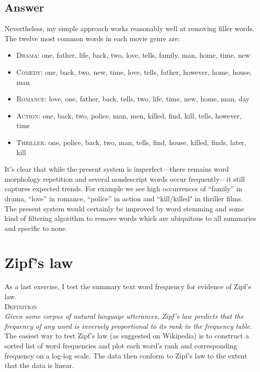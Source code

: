 \documentclass[aps,prc,reprint,amsmath]{revtex4-1}
\begin{document}
\subsection*{Answer}
Nevertheless, my simple approach works reasonably well at removing filler words. The twelve most common words in each movie genre are: 
\begin{itemize}
  \item \textsc{Drama}: one, father, life, back, two, love, tells, family, man, home, time, new 
  \item \textsc{Comedy}: one, back, two, new, time, love, tells, father, however, home, house, man
  \item \textsc{Romance}: love, one, father, back, tells, two, life, time, new, home, man, day
  \item \textsc{Action}: one, back, two, police, man, men, killed, find, kill, tells, however, time 
  \item \textsc{Thriller}: one, police, back, two, man, tells, find, house, killed, finds, later, kill 
\end{itemize}

It's clear that while the present system is imperfect---there remains word morphology repetition and several nondescript words occur frequently---it still captures expected trends. For example we see high occurrences of ``family'' in drama, ``love'' in romance, ``police'' in action and ``kill/killed" in thriller films. The present system would certainly be improved by word stemming and some kind of filtering algorithm to remove words which are ubiquitous to all summaries and specific to none. 

\section{Zipf's law}

As a last exercise, I test the summary text word frequency for evidence of Zipf's law.\\[2ex]
{\noindent \textsc{Definition}\\ 
\emph{Given some corpus of natural language utterances, Zipf's law predicts that the frequency of any word is inversely proportional to its rank in the frequency table.}}\\[1ex]

The easiest way to test Zipf's law (as suggested on Wikipedia) is to construct a sorted list of word frequencies and plot each word's rank and corresponding frequency on a log-log scale. The data then conform to Zipf's law to the extent that the data is linear. 
\end{document}
